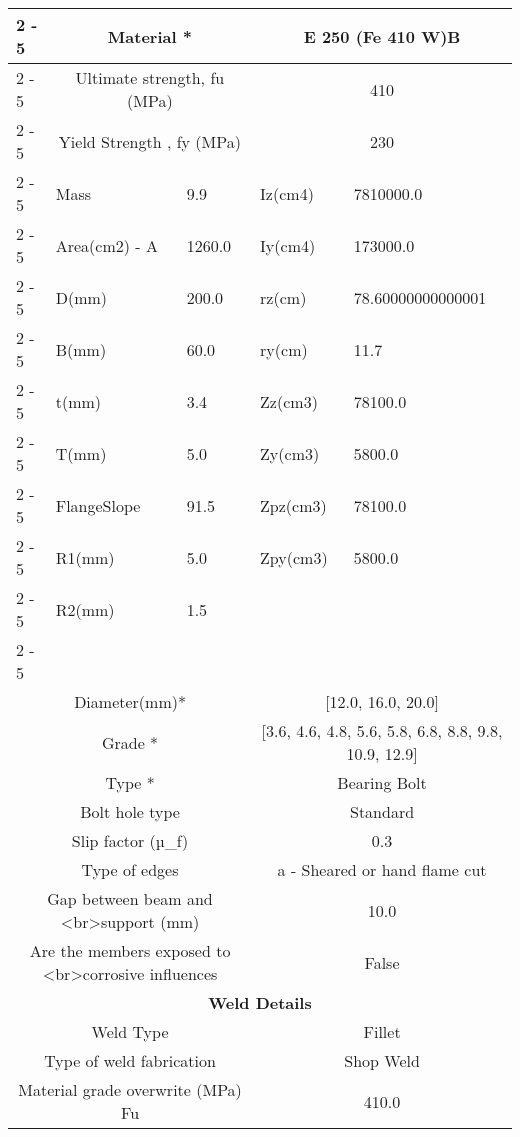 \documentclass{article}%
\begin{document}
\begin{longtable}{|p{5cm}|p{2cm}|p{2cm}|p{2cm}|p{5cm}|}
\cline{2%
-%
5}%
&\multicolumn{2}{|c|}{Material *}&\multicolumn{2}{|c|}{E 250 (Fe 410 W)B}\\%
\cline{2%
-%
5}%
&\multicolumn{2}{|c|}{Ultimate strength, fu (MPa)}&\multicolumn{2}{|c|}{410}\\%
\cline{2%
-%
5}%
&\multicolumn{2}{|c|}{Yield Strength , fy (MPa)}&\multicolumn{2}{|c|}{230}\\%
\cline{2%
-%
5}%
&Mass&9.9&Iz(cm4)&7810000.0\\%
\cline{2%
-%
5}%
&Area(cm2) {-} A&1260.0&Iy(cm4)&173000.0\\%
\cline{2%
-%
5}%
&D(mm)&200.0&rz(cm)&78.60000000000001\\%
\cline{2%
-%
5}%
&B(mm)&60.0&ry(cm)&11.7\\%
\cline{2%
-%
5}%
&t(mm)&3.4&Zz(cm3)&78100.0\\%
\cline{2%
-%
5}%
&T(mm)&5.0&Zy(cm3)&5800.0\\%
\cline{2%
-%
5}%
&FlangeSlope&91.5&Zpz(cm3)&78100.0\\%
\cline{2%
-%
5}%
&R1(mm)&5.0&Zpy(cm3)&5800.0\\%
\cline{2%
-%
5}%
&R2(mm)&1.5&&\\%
\cline{2%
-%
5}%
\hline%
\multicolumn{5}{|c|}{\textbf{Bolt Details}}\\%
\hline%
\hline%
\multicolumn{3}{|c|}{Diameter(mm)*}&\multicolumn{2}{|c|}{{[}12.0, 16.0, 20.0{]}}\\%
\hline%
\hline%
\multicolumn{3}{|c|}{Grade *}&\multicolumn{2}{|c|}{{[}3.6, 4.6, 4.8, 5.6, 5.8, 6.8, 8.8, 9.8, 10.9, 12.9{]}}\\%
\hline%
\hline%
\multicolumn{3}{|c|}{Type *}&\multicolumn{2}{|c|}{Bearing Bolt}\\%
\hline%
\hline%
\multicolumn{3}{|c|}{Bolt hole type}&\multicolumn{2}{|c|}{Standard}\\%
\hline%
\hline%
\multicolumn{3}{|c|}{Slip factor (µ\_f)}&\multicolumn{2}{|c|}{0.3}\\%
\hline%
\hline%
\multicolumn{3}{|c|}{Type of edges}&\multicolumn{2}{|c|}{a {-} Sheared or hand flame cut}\\%
\hline%
\hline%
\multicolumn{3}{|c|}{Gap between beam and <br>support (mm)}&\multicolumn{2}{|c|}{10.0}\\%
\hline%
\hline%
\multicolumn{3}{|c|}{Are the members exposed to <br>corrosive influences}&\multicolumn{2}{|c|}{False}\\%
\hline%
\hline%
\multicolumn{5}{|c|}{\textbf{Weld Details}}\\%
\hline%
\hline%
\multicolumn{3}{|c|}{Weld Type}&\multicolumn{2}{|c|}{Fillet}\\%
\hline%
\hline%
\multicolumn{3}{|c|}{Type of weld fabrication}&\multicolumn{2}{|c|}{Shop Weld}\\%
\hline%
\hline%
\multicolumn{3}{|c|}{Material grade overwrite (MPa) Fu}&\multicolumn{2}{|c|}{410.0}\\%
\hline%
\end{longtable}
\end{document}
